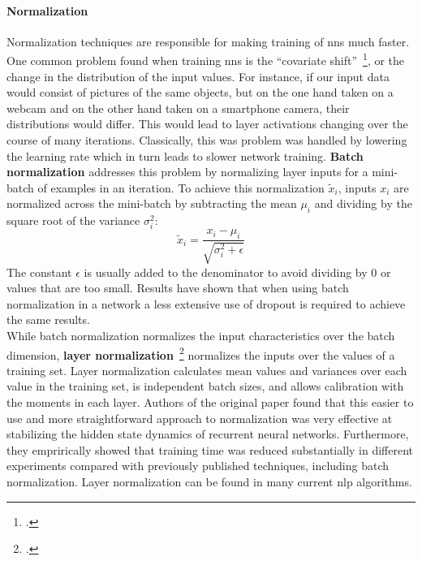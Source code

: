 \paragraph{Normalization}
Normalization techniques are responsible for making training of \gls{nn}s much faster. One common problem found when training \gls{nn}s is the ``covariate shift''~\footcite{DBLP:journals/corr/IoffeS15}, or the change in the distribution of the input values. For instance, if our input data would consist of pictures of the same objects, but on the one hand taken on a webcam and on the other hand taken on a smartphone camera, their distributions would differ. This would lead to layer activations changing over the course of many iterations. Classically, this was problem was handled by lowering the learning rate which in turn leads to slower network training. \textbf{Batch normalization} addresses this problem by normalizing layer inputs for a mini-batch of examples in an iteration. To achieve this normalization $ \widetilde{x}_i $, inputs $ x_i $ are normalized across the mini-batch by subtracting the mean $ \mu_i $ and dividing by the square root of the variance $ \sigma_i^2 $:
\begin{equation}
	\widetilde{x}_i = \frac{x_i - \mu_i}{\sqrt{\sigma_i^2 + \epsilon}}
\end{equation}
The constant $ \epsilon $ is usually added to the denominator to avoid dividing by $ 0 $ or values that are too small. Results have shown that when using batch normalization in a network a less extensive use of dropout is required to achieve the same results. \\
While batch normalization normalizes the input characteristics over the batch dimension, \textbf{layer normalization}~\footcite{ba2016layer} normalizes the inputs over the values of a training set. Layer normalization calculates mean values and variances over each value in the training set, is independent batch sizes, and allows calibration with the moments in each layer. Authors of the original paper found that this easier to use and more straightforward approach to normalization was very effective at stabilizing the hidden state dynamics of recurrent neural networks. Furthermore, they emprirically showed that training time was reduced substantially in different experiments compared with previously published techniques, including batch normalization. Layer normalization can be found in many current \gls{nlp} algorithms.

